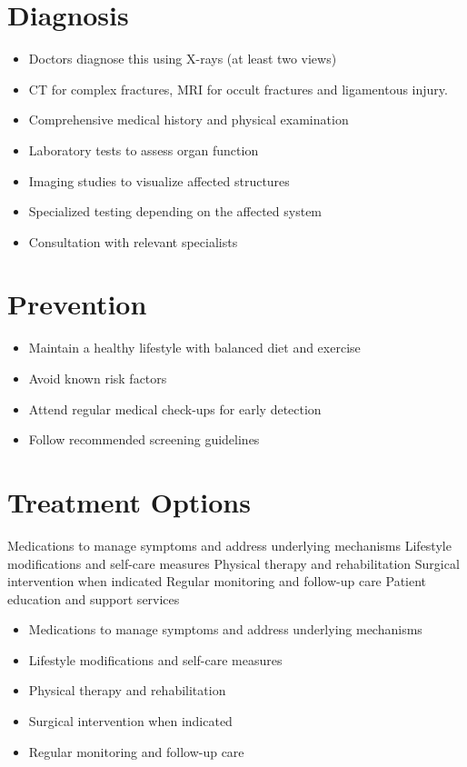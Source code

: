 \section{Diagnosis}
\begin{itemize}[noitemsep]
  \item Doctors diagnose this using X-rays (at least two views)
  \item CT for complex fractures, MRI for occult fractures and ligamentous injury.
  \item Comprehensive medical history and physical examination
  \item Laboratory tests to assess organ function
  \item Imaging studies to visualize affected structures
  \item Specialized testing depending on the affected system
  \item Consultation with relevant specialists
\end{itemize}
\section{Prevention}
\begin{itemize}[noitemsep]
  \item Maintain a healthy lifestyle with balanced diet and exercise
  \item Avoid known risk factors
  \item Attend regular medical check-ups for early detection
  \item Follow recommended screening guidelines
\end{itemize}
\section{Treatment Options}
Medications to manage symptoms and address underlying mechanisms Lifestyle modifications and self-care measures Physical therapy and rehabilitation Surgical intervention when indicated Regular monitoring and follow-up care Patient education and support services

\begin{itemize}[noitemsep]
  \item Medications to manage symptoms and address underlying mechanisms
  \item Lifestyle modifications and self-care measures
  \item Physical therapy and rehabilitation
  \item Surgical intervention when indicated
  \item Regular monitoring and follow-up care
\end{itemize}
